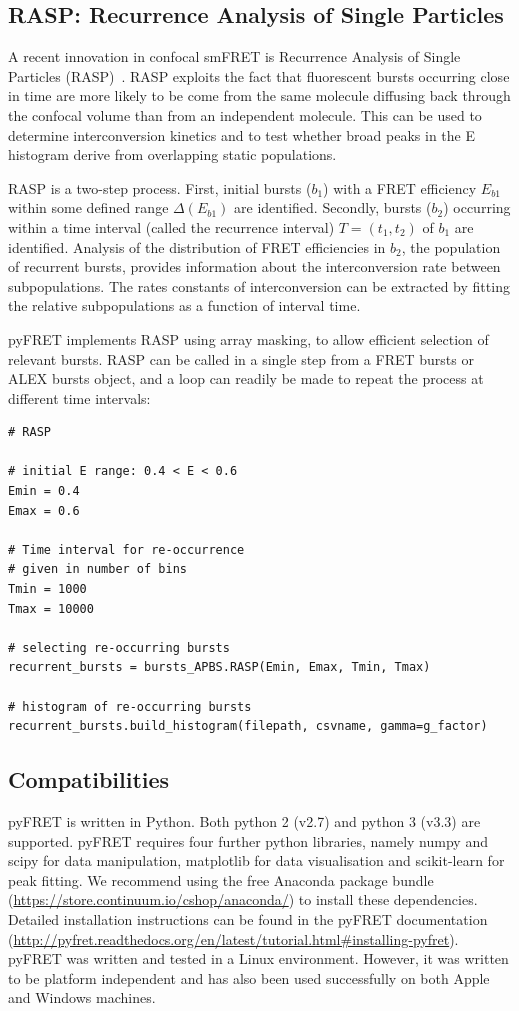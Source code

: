 \documentclass[10pt]{article}
\begin{document}
\subsection*{RASP: Recurrence Analysis of Single Particles}
A recent innovation in confocal smFRET is Recurrence Analysis of Single Particles (RASP)~\cite{hoffmann11}. RASP exploits the fact that fluorescent bursts occurring close in time are more likely to be come from the same molecule diffusing back through the confocal volume than from an independent molecule. This can be used to determine interconversion kinetics and to test whether broad peaks in the E histogram derive from overlapping static populations.

RASP is a two-step process. First, initial bursts ($b_1$) with a FRET efficiency $E_{b1}$ within some defined range $\Delta(E_{b1})$ are identified. Secondly, bursts ($b_2$) occurring within a time interval (called the recurrence interval) $T = (t_1, t_2)$ of $b_1$ are identified. Analysis of the distribution of FRET efficiencies in $b_2$, the population of recurrent bursts, provides information about the interconversion rate between subpopulations. The rates constants of interconversion can be extracted by fitting the relative subpopulations as a function of interval time.

pyFRET implements RASP using array masking, to allow efficient selection of relevant bursts. RASP can be called in a single step from a FRET bursts or ALEX bursts object, and a loop can readily be made to repeat the process at different time intervals:

\begin{lstlisting}
# RASP

# initial E range: 0.4 < E < 0.6
Emin = 0.4
Emax = 0.6

# Time interval for re-occurrence
# given in number of bins
Tmin = 1000
Tmax = 10000

# selecting re-occurring bursts
recurrent_bursts = bursts_APBS.RASP(Emin, Emax, Tmin, Tmax)

# histogram of re-occurring bursts
recurrent_bursts.build_histogram(filepath, csvname, gamma=g_factor)
\end{lstlisting} 

\subsection*{Compatibilities}
pyFRET is written in Python. Both python 2 (v2.7) and python 3 (v3.3) are supported. pyFRET requires four further python libraries, namely numpy and scipy for data manipulation, matplotlib for data visualisation and scikit-learn for peak fitting. We recommend using the free Anaconda package bundle (\url{https://store.continuum.io/cshop/anaconda/}) to install these dependencies. Detailed installation instructions can be found in the pyFRET documentation (\url{http://pyfret.readthedocs.org/en/latest/tutorial.html#installing-pyfret}). pyFRET was written and tested in a Linux environment. However, it was written to be platform independent and has also been used successfully on both Apple and Windows machines.
\end{document}
